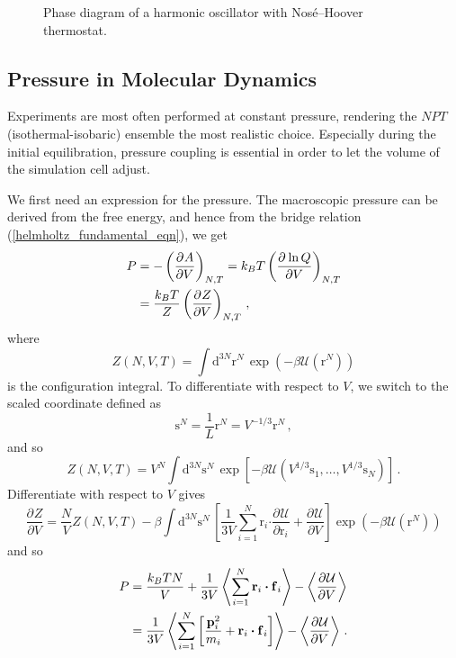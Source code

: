 \documentclass{article}
\theoremstyle{plain}\theoremheaderfont{\normalfont\itshape}\theorembodyfont{\rmfamily}\theoremseparator{.}\newtheorem*{rem}{Remark}\newtheorem*{ex}{Example}\newtheorem*{proof}{Proof}\newtheorem*{altp}{Alternative proof}
\theoremstyle{plain}\theoremheaderfont{\normalfont\bfseries}\theorembodyfont{\rmfamily}\theoremseparator{.}\newtheorem{thm}{Theorem}[section]\newtheorem{lem}[thm]{Lemma}\newtheorem{prop}[thm]{Proposition}\newtheorem*{cor}{Corollary}\newtheorem{defn}[thm]{Definition}\newtheorem{clm}[thm]{Claim}\newtheorem{clminproof}{Claim}\newtheorem{alg}[thm]{Algorithm}\newtheorem{hyp}[thm]{Hypothesis}\newtheorem{law}[thm]{Law}
\theoremstyle{break}\theoremheaderfont{\normalfont\itshape}\theorembodyfont{\rmfamily}\theoremseparator{.\medskip}\newtheorem*{proofskip}{Proof}\newtheorem*{exs}{Examples}\newtheorem*{rems}{Remarks}
\theoremstyle{break}\theoremheaderfont{\normalfont\bfseries}\theorembodyfont{\rmfamily}\theoremseparator{.\medskip}\newtheorem{lemskip}[thm]{Lemma}\newtheorem{defnskip}[thm]{Definition}\newtheorem{propskip}[thm]{Proposition}\newtheorem{thmskip}[thm]{Theorem}
\numberwithin{equation}{section}
\newcommand{\dd}[2][]{\mathrm{d}^{#1} #2\,}
\newcommand{\pdv}[3][]{\frac{\partial^{#1} #2}{{\partial #3}^{#1}}}
\newcommand{\eval}[1]{\left\langle #1 \right\rangle}
\newcommand{\vb}[1]{\bm{\mathrm{#1}}}
\newcommand{\vdot}{\bm{\cdot}}
\begin{document}
    \begin{figure}[ht!]
        \centering
        
        \caption{Phase diagram of a harmonic oscillator with Nos\'{e}--Hoover thermostat.}
    \end{figure}

    \subsection{Pressure in Molecular Dynamics}
    Experiments are most often performed at constant pressure, rendering the \(NPT\) (isothermal-isobaric) ensemble the most realistic choice. Especially during the initial equilibration, pressure coupling is essential in order to let the volume of the simulation cell adjust.

    We first need an expression for the pressure. The macroscopic pressure can be derived from the free energy, and hence from the bridge relation (\ref{helmholtz_fundamental_eqn}), we get
    \begin{align}
        P&=-\left(\pdv{A}{V}\right)_{N,T}=k_B T\left(\pdv{\ln Q}{V}\right)_{N,T}\notag\\
        &=\frac{k_B T}{Z}\left(\pdv{Z}{V}\right)_{N,T}\,,
    \end{align}
    where
    \begin{equation}
        Z(N,V,T)=\int\dd[3N]{\vb{r}^N}\exp(-\beta \mathcal{U}(\vb{r}^N))
    \end{equation}
    is the configuration integral. To differentiate with respect to \(V\), we switch to the scaled coordinate defined as
    \begin{equation}
        \vb{s}^N=\frac{1}{L}\vb{r}^N=V^{-1/3}\vb{r}^N\,,
    \end{equation}
    and so
    \begin{equation}
        Z(N,V,T)=V^N\int\dd[3N]{\vb{s}^N}\exp\left[-\beta \mathcal{U}(V^{1/3}\vb{s}_1,\dots,V^{1/3}\vb{s}_N)\right]\,.
    \end{equation}
    Differentiate with respect to \(V\) gives
    \begin{equation}
        \pdv{Z}{V}=\frac{N}{V}Z(N,V,T)-\beta\int\dd[3N]{\vb{s}^N}\left[\frac{1}{3V}\sum_{i=1}^{N}\vb{r}_i\vdot\pdv{\mathcal{U}}{\vb{r}_i}+\pdv{\mathcal{U}}{V}\right]\exp(-\beta\mathcal{U}(\vb{r}^N))
    \end{equation}
    and so
    \begin{align}
        P&=\frac{k_B T N}{V}+\frac{1}{3V}\eval{\sum_{i=1}^{N}\vb{r}_i\vdot\vb{f}_i}-\eval{\pdv{\mathcal{U}}{V}}\notag \\
        &=\frac{1}{3V}\eval{\sum_{i=1}^{N}\left[\frac{\vb{p}_i^2}{m_i}+\vb{r}_i\vdot\vb{f}_i\right]}-\eval{\pdv{\mathcal{U}}{V}}\,.
    \end{align}
\end{document}

